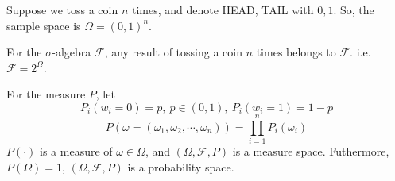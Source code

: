 \documentclass[12pt]{article}
\newenvironment{solution}{\begin{tcolorbox}[colback=white, colframe=black!50, breakable, title=Solution. ]\setlength{\parskip}{0.8em}}{\end{tcolorbox}}
\begin{document}
    \begin{solution}
        Suppose we toss a coin $n$ times, and denote HEAD, TAIL with $0,1$. So, the sample space is $\Omega=(0,1)^n$. 

        For the $\sigma$-algebra $\mathscr{F}$, any result of tossing a coin $n$ times belongs to $\mathscr{F}$. i.e. $\mathscr{F}=2^\Omega$. 

        For the measure $P$, let 
        \[P_i(w_i=0)=p,\ p\in(0,1),\ P_i(w_i=1)=1-p\]
        \[P(\omega=(\omega_1,\omega_2,\cdots,\omega_n))=\prod_{i=1}^nP_i(\omega_i)\]
        $P(\cdot)$ is a measure of $\omega\in\Omega$, and $(\Omega, \mathscr{F}, P)$ is a measure space. Futhermore, $P(\Omega)=1$, $(\Omega, \mathscr{F}, P)$ is a probability space. 
    \end{solution}

\end{document}
